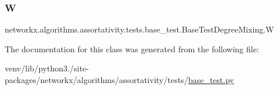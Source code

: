 \subsubsection{\texorpdfstring{W}{W}}
{\footnotesize\ttfamily networkx.\+algorithms.\+assortativity.\+tests.\+base\+\_\+test.\+Base\+Test\+Degree\+Mixing.\+W}



The documentation for this class was generated from the following file\+:\begin{DoxyCompactItemize}
\item 
venv/lib/python3./site-\/packages/networkx/algorithms/assortativity/tests/\hyperlink{base__test_8py}{base\+\_\+test.\+py}\end{DoxyCompactItemize}
